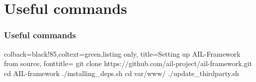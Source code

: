 
\begin{frame}[t,plain]
\end{frame}

\section{Useful commands}
\begin{frame}
\frametitle{Useful commands}

\begin{tcblisting}{colback=black!85,coltext=green,listing only, title=Setting up AIL-Framework from source, fonttitle=\bfseries}
git clone https://github.com/ail-project/ail-framework.git
cd AIL-framework
./installing_deps.sh
cd var/www/
./update_thirdparty.sh
\end{tcblisting}

%
%
%

\end{frame}
